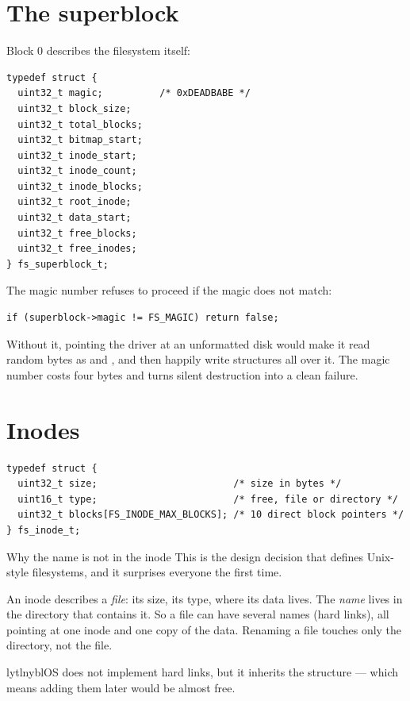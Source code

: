 \section{The superblock}

Block 0 describes the filesystem itself:

\begin{lstlisting}[style=c]
typedef struct {
  uint32_t magic;          /* 0xDEADBABE */
  uint32_t block_size;
  uint32_t total_blocks;
  uint32_t bitmap_start;
  uint32_t inode_start;
  uint32_t inode_count;
  uint32_t inode_blocks;
  uint32_t root_inode;
  uint32_t data_start;
  uint32_t free_blocks;
  uint32_t free_inodes;
} fs_superblock_t;
\end{lstlisting}

\begin{concept}{The magic number}
 refuses to proceed if the magic does not match:
\begin{lstlisting}[style=c]
if (superblock->magic != FS_MAGIC) return false;
\end{lstlisting}
Without it, pointing the driver at an unformatted disk would make it read random bytes as
 and , and then happily write structures all over it. The magic
number costs four bytes and turns silent destruction into a clean failure.
\end{concept}

\section{Inodes}

\begin{lstlisting}[style=c]
typedef struct {
  uint32_t size;                        /* size in bytes */
  uint16_t type;                        /* free, file or directory */
  uint32_t blocks[FS_INODE_MAX_BLOCKS]; /* 10 direct block pointers */
} fs_inode_t;
\end{lstlisting}

\begin{concept}{Why the name is not in the inode}
This is the design decision that defines Unix-style filesystems, and it surprises everyone the first
time.

An inode describes a \emph{file}: its size, its type, where its data lives. The \emph{name} lives in
the directory that contains it. So a file can have several names (hard links), all pointing at one
inode and one copy of the data. Renaming a file touches only the directory, not the file.

lytlnyblOS does not implement hard links, but it inherits the structure --- which means adding them
later would be almost free.
\end{concept}

